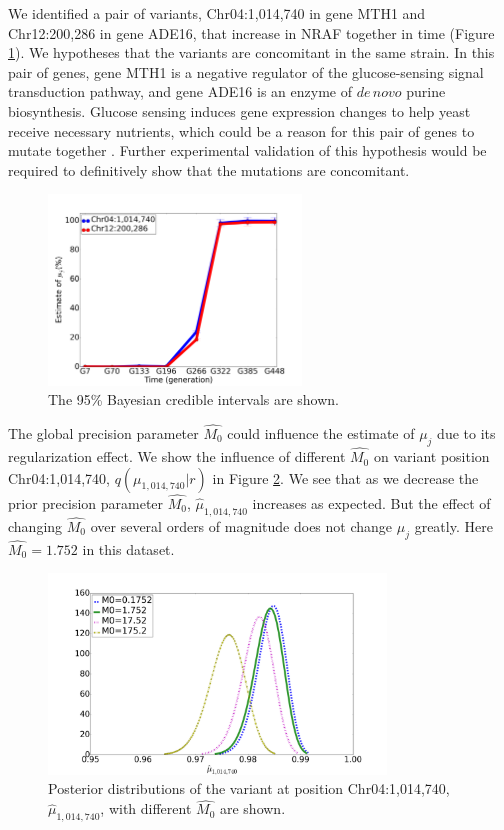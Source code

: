 \documentclass{bmcart}
\begin{document}
We identified a pair of variants, Chr04:1,014,740 in gene MTH1 and Chr12:200,286 in gene ADE16, that increase in NRAF together in time (Figure \ref{figure:concomitant}).
We hypotheses that the variants are concomitant in the same strain.
In this pair of genes, gene MTH1 is a negative regulator of the glucose-sensing signal transduction pathway, and gene ADE16 is an enzyme of $\mathit{de\, novo}$ purine biosynthesis.
Glucose sensing induces gene expression changes to help yeast receive necessary nutrients, which could be a reason for this pair of genes to mutate together \cite{johnston1999feasting}.
Further experimental validation of this hypothesis would be required to definitively show that the mutations are concomitant.
\begin{figure}[htbp]
\centering
\includegraphics[width=0.6\textwidth]{concomitant.png}
\caption{
The 95\% Bayesian credible intervals are shown.}
\label{figure:concomitant}
\end{figure}

The global precision parameter $\hat{M_0}$ could influence the estimate of $\mu_j$ due to its regularization effect.
We show the influence of different $\hat{M_0}$ on variant position Chr04:1,014,740, $q(\mu_{1,014,740}|r)$ in Figure \ref{tbl:M0}.
We see that as we decrease the prior precision parameter $\hat{M_0}$, $\hat{\mu}_{1,014,740}$ increases as expected.
But the effect of changing $\hat{M_0}$ over several orders of magnitude does not change $\mu_j$ greatly.
Here $\hat{M_0} = 1.752$ in this dataset.
\begin{figure}[htbp]
\centering
\includegraphics[width=0.8\textwidth]{M0.png}
\caption{
Posterior distributions of the variant at position Chr04:1,014,740, $\hat{\mu}_{1,014,740}$, with different $\hat{M_0}$ are shown.}
\label{tbl:M0}
\end{figure}
\end{document}
